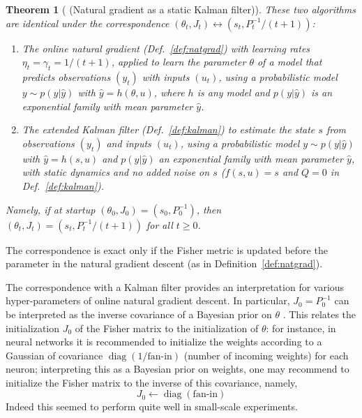 \documentclass[11pt,a4paper]{article}
\renewcommand{\geq}{\geqslant}
\DeclareMathOperator{\diag}{diag}
\newcommand{\1}{\mathbbm{1}}
\theoremstyle{yannthm}
\newtheorem{thm}[defi]{Theorem}
\theoremstyle{yannthm2}
\numberwithin{equation}{section}
\begin{document}
\begin{thm}[ (Natural gradient as a static Kalman filter)]
\label{thm:natkal}
These two algorithms are identical under the correspondence
$(\theta_t,J_t)\leftrightarrow (s_t,P_t^{-1}/(t+1))$:
\begin{enumerate}
\item The online natural gradient (Def.~\ref{def:natgrad}) with learning
rates $\eta_t=\gamma_t=1/(t+1)$, applied to learn the parameter $\theta$
of a model that
predicts observations $(y_t)$ with inputs $(u_t)$, using a
probabilistic model $y\sim p (y|\hat y)$ with $\hat y=h(\theta,u)$, where
$h$ is any model and $p(y|\hat y)$ is an
exponential family with mean parameter $\hat y$.%
\item The extended Kalman filter (Def.~\ref{def:kalman}) to estimate the state $s$ from
observations $(y_t)$ and inputs $(u_t)$,
using a
probabilistic model $y\sim p (y|\hat y)$ with $\hat y=h(s,u)$ and
$p(y|\hat y)$ an
exponential family with mean parameter $\hat y$, 
with static dynamics and no
added noise on $s$
($f(s,u)=s$ and $Q=0$ in Def.~\ref{def:kalman}).
\end{enumerate}

Namely, if at startup $(\theta_0,J_0)=(s_0,P_0^{-1})$, then
$(\theta_t,J_t)=(s_t,P_t^{-1}/(t+1))$ for all $t\geq 0$.
\end{thm}

The correspondence is exact only if the Fisher metric is updated before
the parameter in the natural gradient descent (as in
Definition~\ref{def:natgrad}).

The
correspondence with a Kalman filter provides an interpretation for
various hyper-parameters of online natural gradient descent. %
%
In particular, $J_0=P_0^{-1}$ can be interpreted as the inverse
covariance of a Bayesian prior on $\theta$ \cite{singhalwu1988}. This
relates the initialization $J_0$ of the Fisher matrix to the
initialization of $\theta$: for instance, in neural networks it is
recommended to initialize the weights according to a Gaussian of
covariance $\diag(1/\text{fan-in})$ (number of incoming weights) for each
neuron; interpreting this as a Bayesian prior on weights, one may
recommend to initialize the Fisher matrix to the inverse of this
covariance, namely,
\begin{equation}J_0\gets\diag(\text{fan-in})\end{equation} Indeed this seemed to
perform quite well in small-scale experiments.
\end{document}
